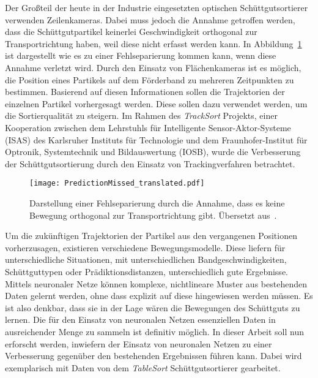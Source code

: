 
Der Großteil der heute in der Industrie eingesetzten optischen Schüttgutsortierer verwenden Zeilenkameras.
Dabei muss jedoch die Annahme getroffen werden, dass die Schüttgutpartikel keinerlei Geschwindigkeit orthogonal zur Transportrichtung haben,
weil diese nicht erfasst werden kann.
In Abbildung~\ref{fig:predMissed} ist dargestellt wie es zu einer Fehlseparierung kommen kann, wenn diese Annahme verletzt wird.
Durch den Einsatz von Flächenkameras ist es möglich, die Position eines Partikels auf dem Förderband zu mehreren Zeitpunkten zu bestimmen.
Basierend auf diesen Informationen sollen die Trajektorien der einzelnen Partikel vorhergesagt werden.
Diese sollen dazu verwendet werden, um die Sortierqualität zu steigern. 
Im Rahmen des \textit{TrackSort} Projekts, 
einer Kooperation zwischen dem Lehrstuhls für Intelligente Sensor-Aktor-Systeme (ISAS) des Karlsruher Instituts für Technologie
und dem Fraunhofer-Institut für Optronik, Systemtechnik und Bildauswertung (IOSB), 
wurde die Verbesserung der Schüttgutsortierung durch den Einsatz von Trackingverfahren betrachtet.

\begin{figure}[h]
    \centering
    \texttt{[image: PredictionMissed\_translated.pdf]}
    \caption{Darstellung einer Fehlseparierung durch die Annahme, dass es keine Bewegung orthogonal zur Transportrichtung gibt. 
    Übersetzt aus~\cite{Pfaff2018}.}
    \label{fig:predMissed}
\end{figure}


Um die zukünftigen Trajektorien der Partikel aus den vergangenen Positionen vorherzusagen, existieren verschiedene Bewegungsmodelle.
Diese liefern für unterschiedliche Situationen, mit unterschiedlichen Bandgeschwindigkeiten, Schüttguttypen oder Prädiktionsdistanzen, unterschiedlich gute Ergebnisse.  
Mittels neuronaler Netze können komplexe, nichtlineare Muster aus bestehenden Daten gelernt werden, ohne dass explizit auf diese hingewiesen werden müssen.
Es ist also denkbar, dass sie in der Lage wären die Bewegungen des Schüttguts zu lernen.
Die für den Einsatz von neuronalen Netzen essenziellen Daten in ausreichender Menge zu sammeln ist definitiv möglich. 
In dieser Arbeit soll nun erforscht werden, inwiefern der Einsatz von neuronalen Netzen zu einer Verbesserung gegenüber den bestehenden Ergebnissen führen kann.
Dabei wird exemplarisch mit Daten von dem \textit{TableSort} Schüttgutsortierer gearbeitet.

